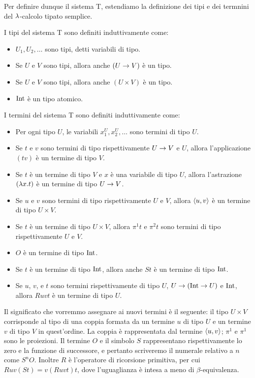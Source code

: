 \documentclass[]{marticle}
\begin{document}
Per definire dunque il sistema T, estendiamo la definizione dei tipi e dei
termnini del $\lambda$-calcolo tipato semplice. 
\begin{block}[Definizione]
    I tipi del sistema T sono definiti induttivamente come:
    \begin{itemize}
        \item $U_1, U_2, \dots$ sono tipi, detti variabili di tipo.
        \item Se $U$ e $V$ sono tipi, allora anche $(U\rightarrow V)$ \`e un tipo.
        \item Se $U$ e $V$ sono tipi, allora anche $(U\times V)$ \`e un tipo.
        \item $\text{Int}$ \`e un tipo atomico.
    \end{itemize}

    I termini del sistema T sono definiti induttivamente come:
    \begin{itemize}
        \item Per ogni tipo $U$, le variabili $x^U_1, x^U_2, \dots$ sono termini
            di tipo $U$.
        \item Se $t$ e $v$ sono termini di tipo rispettivamente $U\rightarrow V$ e $U$,
            allora l'applicazione $(tv)$ \`e un termine di tipo $V$.
        \item Se $t$ \`e un termine di tipo $V$ e $x$ \`e una variabile di tipo
            $U$, allora l'astrazione $(\lambda x.  t)$ \`e un termine di tipo $U\rightarrow
            V$.
        \item Se $u$ e $v$ sono termini di tipo rispettivamente $U$ e $V$,
            allora $\langle u,v \rangle$ \`e un termine di tipo $U\times V$.
        \item Se $t$ \`e un termine di tipo $U\times V$, allora $\pi^1 t$ e
            $\pi^2t$ sono termini di tipo rispettivamente $U$ e $V$.
        \item $O$ \`e un termine di tipo $\text{Int}$.
        \item Se $t$ \`e un termine di tipo $\text{Int}$, allora anche $St$ \`e un
            termine di tipo $\text{Int}$.
        \item Se $u$, $v$, e $t$ sono termini rispettivamente di tipo $U$,
            $U\rightarrow (\text{Int}\rightarrow U)$ e $\text{Int}$, allora $Ruvt$ \`e un termine di
            tipo $U$.
    \end{itemize}
\end{block}

Il significato che vorremmo assegnare ai nuovi termini \`e il seguente: il tipo
$U\times V$ corrisponde al tipo di una coppia formata da un termine $u$ di tipo
$U$ e un termine $v$ di tipo $V$ in quest'ordine. La coppia \`e rappresentata
dal termine $\langle u,v \rangle$; $\pi^1$ e $\pi^1$ sono le proiezioni.  Il termine $O$ e
il simbolo $S$ rappresentano rispettivamente lo zero e la funzione di
successore, e pertanto scriveremo il numerale relativo a $n$ come $S^nO$.
Inoltre $R$ \`e l'operatore di ricorsione primitiva, per cui $Ruv(St) =
v(Ruvt)t$, dove l'uguaglianza \`e intesa a meno di $\beta$-equivalenza.
\end{document}
